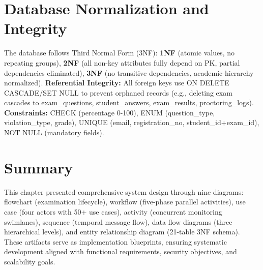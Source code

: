 \section{Database Normalization and Integrity}

The database follows Third Normal Form (3NF): \textbf{1NF} (atomic values, no repeating groups), \textbf{2NF} (all non-key attributes fully depend on PK, partial dependencies eliminated), \textbf{3NF} (no transitive dependencies, academic hierarchy normalized). \textbf{Referential Integrity:} All foreign keys use ON DELETE CASCADE/SET NULL to prevent orphaned records (e.g., deleting exam cascades to exam\_questions, student\_answers, exam\_results, proctoring\_logs). \textbf{Constraints:} CHECK (percentage 0-100), ENUM (question\_type, violation\_type, grade), UNIQUE (email, registration\_no, student\_id+exam\_id), NOT NULL (mandatory fields).

\section{Summary}

This chapter presented comprehensive system design through nine diagrams: flowchart (examination lifecycle), workflow (five-phase parallel activities), use case (four actors with 50+ use cases), activity (concurrent monitoring swimlanes), sequence (temporal message flow), data flow diagrams (three hierarchical levels), and entity relationship diagram (21-table 3NF schema). These artifacts serve as implementation blueprints, ensuring systematic development aligned with functional requirements, security objectives, and scalability goals.
